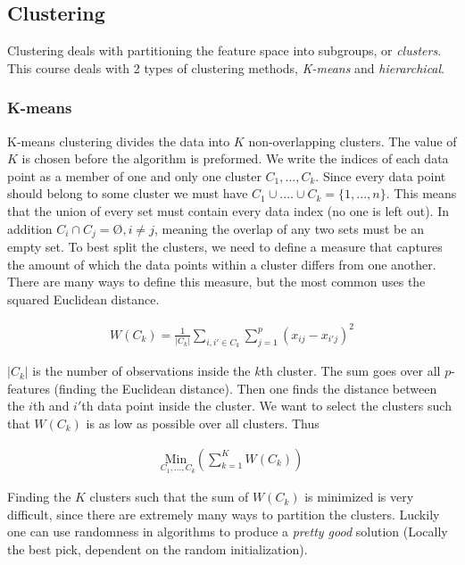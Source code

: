\documentclass{article}
\begin{document}
\subsection{Clustering}
Clustering deals with partitioning the feature space into subgroups, or \textit{clusters}. This course deals with 2 types of clustering methods, \textit{K-means} and \textit{hierarchical}.

\subsubsection{K-means}
K-means clustering divides the data into $K$ non-overlapping clusters. The value of $K$ is chosen before the algorithm is preformed. We write the indices of each data point as a member of one and only one cluster $C_1 , ... , C_k$. Since every data point should belong to some cluster we must have $C_1 \cup .... \cup C_k = \{ 1, ... , n\}$. This means that the union of every set must contain every data index (no one is left out). In addition $C_i \cap C_j = Ø, i\neq j$, meaning the overlap of any two sets must be an empty set. To best split the clusters, we need to define a measure that captures the amount of which the data points within a cluster differs from one another. There are many ways to define this measure, but the most common uses the squared Euclidean distance. 

\begin{align*}
    W(C_k) = \frac{1}{|C_k|} \sum_{i,i' \in C_k}\sum_{j=1}^{p} (x_{ij}-x_{i'j})^2
\end{align*}

$|C_k|$ is the number of observations inside the $k$th cluster. The sum goes over all $p$-features (finding the Euclidean distance). Then one finds the distance between the $i$th and $i'$th data point inside the cluster. We want to select the clusters such that $W(C_k)$ is as low as possible over all clusters. Thus

\begin{align*}
    \underset{C_1,...,C_k}{\text{Min }} \left( \sum_{k=1}^{K}W(C_k) \right)
\end{align*}

Finding the $K$ clusters such that the sum of $W(C_k)$ is minimized is very difficult, since there are extremely many ways to partition the clusters. Luckily one can use randomness in algorithms to produce a \textit{pretty good} solution (Locally the best pick, dependent on the random initialization). 
\end{document}

